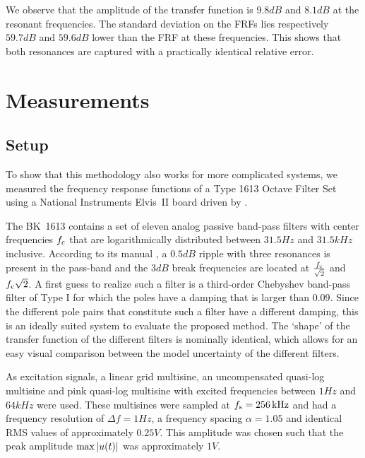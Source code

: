 We observe that the amplitude of the transfer function is $9.8\unit{dB}$ and $8.1\unit{dB}$ at the resonant frequencies.
The standard deviation on the \glspl{FRF} lies respectively $59.7 \unit{dB}$ and $59.6 \unit{dB}$ lower than the \gls{FRF} at these frequencies. 
This shows that both resonances are captured with a practically identical relative error.
  
\section{Measurements} \label{sec:measurement}
  \subsection{Setup}
    To show that this methodology also works for more complicated systems, we measured the frequency response functions of a \bruelkjaer Type 1613 Octave Filter Set using a National Instruments Elvis~II board driven by \labview.
    
    The BK~1613 contains a set of eleven analog passive band-pass filters with center frequencies $f_{\mathrm{c}}$ that are logarithmically distributed between $31.5\unit{Hz}$ and $31.5\unit{kHz}$ inclusive.
    According to its manual \citep{datasheet_bk1613}, a $0.5\unit{dB}$ ripple with three resonances is present in the pass-band and the $3\unit{dB}$ break frequencies are located at $\frac{f_{\mathrm{c}}}{\sqrt{2}}$ and $f_{\mathrm{c}} \sqrt{2}$.
    A first guess to realize such a filter is a third-order Chebyshev band-pass filter of Type I \citep{Zverev1967} for which the poles have a damping that is larger than $0.09$.
    Since the different pole pairs that constitute such a filter have a different damping, this is an ideally suited system to evaluate the proposed method.
    The `shape' of the transfer function of the different filters is nominally identical, which allows for an easy visual comparison between the model uncertainty of the different filters.

    As excitation signals, a linear grid multisine, an uncompensated quasi-log multisine and pink quasi-log multisine with excited frequencies between $1 \unit{Hz}$ and $64 \unit{kHz}$ were used.
    These multisines were sampled at $f_{\mathrm{s}} = 256\,\mathrm{kHz}$ and had a frequency resolution of $\Delta f = 1 \unit{Hz}$, a frequency spacing $\alpha = 1.05$ and identical RMS values of approximately $0.25 \unit{V}$.
    This amplitude was chosen such that the peak amplitude $\max \left| u(t) \right|$ was approximately $1 \unit{V}$.

